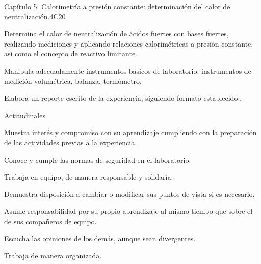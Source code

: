 \begin{syllabus}
\begin{unit}{Capítulo 5:  Calorimetría a presión constante: determinación del calor de neutralización.}{}{}{4}{C20}
\begin{topics}
      \item Determina el calor de neutralización de ácidos fuertes con bases fuertes, realizando mediciones y aplicando relaciones calorimétricas a presión constante, así como el concepto de reactivo limitante.
      \item Manipula adecuadamente instrumentos básicos de laboratorio: instrumentos de medición volumétrica, balanza, termómetro.
      \item Elabora un reporte escrito de la experiencia, siguiendo formato establecido..
   \end{topics}
   
   Actitudinales

\begin{topics}
      \item Muestra interés y compromiso con su aprendizaje cumpliendo con la preparación de las actividades previas a la experiencia.
	  \item Conoce y cumple las normas de seguridad en el laboratorio.
	  \item Trabaja en equipo, de manera responsable y solidaria.
	  \item Demuestra disposición a cambiar o modificar sus puntos de vista si es necesario.
	  \item Asume responsabilidad por su propio aprendizaje al mismo tiempo que sobre el de sus compañeros de equipo.
	  \item Escucha las opiniones de los demás, aunque sean divergentes.
	  \item Trabaja de manera organizada.
   \end{topics}

   \begin{learningoutcomes}
      \item 
   \end{learningoutcomes}
   
\end{unit}



\begin{coursebibliography}
\end{coursebibliography}


\end{syllabus}
